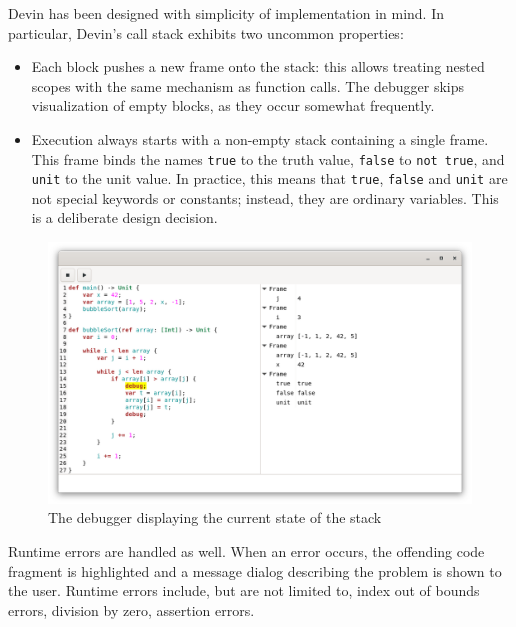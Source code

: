 \documentclass[11pt, american, draft]{PhdThesis}
\begin{document}
  Devin has been designed with simplicity of implementation in mind. In particular, Devin's call
  stack exhibits two uncommon properties:

  \begin{itemize}[noitemsep,topsep=0pt]
    \item Each block pushes a new frame onto the stack: this allows treating nested scopes with the
    same mechanism as function calls. The debugger skips visualization of empty blocks, as they
    occur somewhat frequently.

    \item Execution always starts with a non-empty stack containing a single frame. This frame binds
    the names \verb$true$ to the truth value, \verb$false$ to \verb$not true$, and \verb$unit$ to
    the unit value. In practice, this means that \verb$true$, \verb$false$ and \verb$unit$ are not
    special keywords or constants; instead, they are ordinary variables. This is a deliberate design
    decision.
  \end{itemize}

  \begin{figure}[H]
    \center
    \includegraphics[width=0.9\linewidth]{5.png}
    \caption{The debugger displaying the current state of the stack}
  \end{figure}

  Runtime errors are handled as well. When an error occurs, the offending code fragment is
  highlighted and a message dialog describing the problem is shown to the user. Runtime errors
  include, but are not limited to, index out of bounds errors, division by zero, assertion errors.
\end{document}
